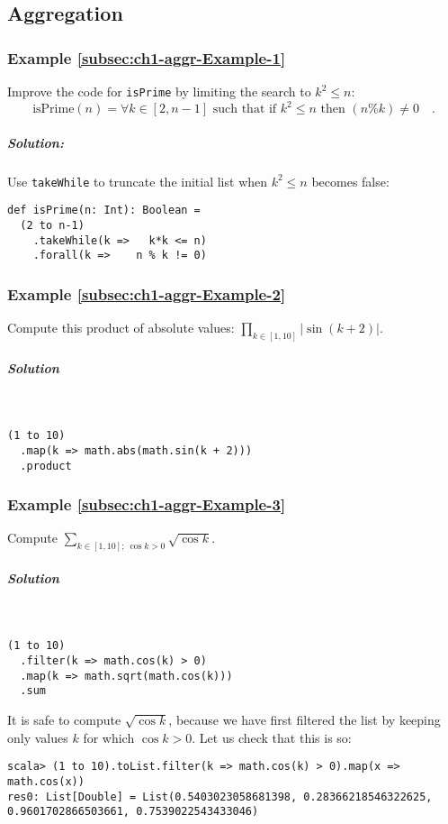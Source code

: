 \subsection{Aggregation\label{subsec:Aggregation-solved-examples}}

\subsubsection{Example \label{subsec:ch1-aggr-Example-1}\ref{subsec:ch1-aggr-Example-1}}

Improve the code for \lstinline!isPrime! by limiting the search to
$k^{2}\leq n$:
\[
\text{isPrime}\left(n\right)=\forall k\in\left[2,n-1\right]\text{ such that if }k^{2}\leq n\text{ then }(n\%k)\neq0\quad.
\]


\subparagraph{Solution:}

Use \lstinline!takeWhile! to truncate the initial list when $k^{2}\leq n$
becomes false:
\begin{lstlisting}
def isPrime(n: Int): Boolean =
  (2 to n-1)
    .takeWhile(k =>   k*k <= n)
    .forall(k =>    n % k != 0)
\end{lstlisting}


\subsubsection{Example \label{subsec:ch1-aggr-Example-2}\ref{subsec:ch1-aggr-Example-2}}

Compute this product of absolute values: $\prod_{k\in\left[1,10\right]}\left|\sin\left(k+2\right)\right|$.

\subparagraph{Solution}

~
\begin{lstlisting}
(1 to 10)
  .map(k => math.abs(math.sin(k + 2)))
  .product
\end{lstlisting}


\subsubsection{Example \label{subsec:ch1-aggr-Example-3}\ref{subsec:ch1-aggr-Example-3}}

Compute $\sum_{k\in[1,10];~\cos k>0}\sqrt{\cos k}$.

\subparagraph{Solution}

~

\begin{lstlisting}
(1 to 10)
  .filter(k => math.cos(k) > 0)
  .map(k => math.sqrt(math.cos(k)))
  .sum
\end{lstlisting}
It is safe to compute $\sqrt{\cos k}$, because we have first filtered
the list by keeping only values $k$ for which $\cos k>0$. Let us
check that this is so:
\begin{lstlisting}
scala> (1 to 10).toList.filter(k => math.cos(k) > 0).map(x => math.cos(x))
res0: List[Double] = List(0.5403023058681398, 0.28366218546322625, 0.9601702866503661, 0.7539022543433046)
\end{lstlisting}


